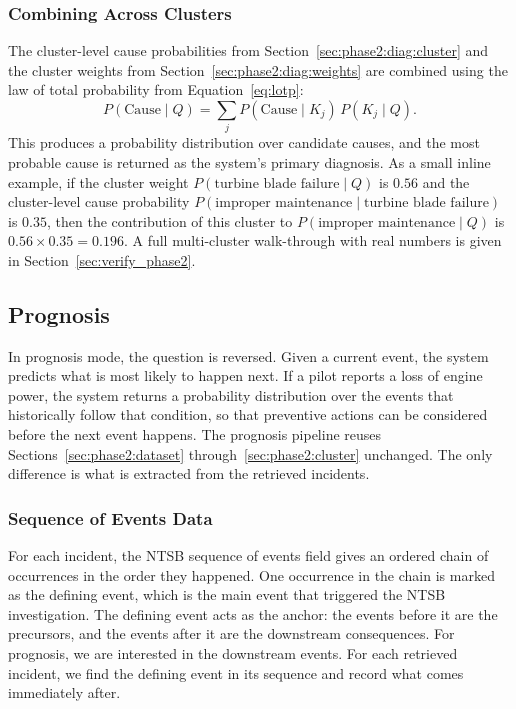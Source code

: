 \documentclass[11pt]{article}
\begin{document}
\subsubsection{Combining Across Clusters}
\label{sec:phase2:diag:lotp}

The cluster-level cause probabilities from Section~\ref{sec:phase2:diag:cluster} and the cluster weights from Section~\ref{sec:phase2:diag:weights} are combined using the law of total probability from Equation~\ref{eq:lotp}:
\begin{equation}
P(\text{Cause} \mid Q) = \sum_{j} P(\text{Cause} \mid K_j) \, P(K_j \mid Q).
\label{eq:diag_lotp}
\end{equation}
This produces a probability distribution over candidate causes, and the most probable cause is returned as the system's primary diagnosis. As a small inline example, if the cluster weight $P(\text{turbine blade failure} \mid Q)$ is $0.56$ and the cluster-level cause probability $P(\text{improper maintenance} \mid \text{turbine blade failure})$ is $0.35$, then the contribution of this cluster to $P(\text{improper maintenance} \mid Q)$ is $0.56 \times 0.35 = 0.196$. A full multi-cluster walk-through with real numbers is given in Section~\ref{sec:verify_phase2}.

\subsection{Prognosis}
\label{sec:phase2:prog}

In prognosis mode, the question is reversed. Given a current event, the system predicts what is most likely to happen next. If a pilot reports a loss of engine power, the system returns a probability distribution over the events that historically follow that condition, so that preventive actions can be considered before the next event happens. The prognosis pipeline reuses Sections~\ref{sec:phase2:dataset} through~\ref{sec:phase2:cluster} unchanged. The only difference is what is extracted from the retrieved incidents.

\subsubsection{Sequence of Events Data}
\label{sec:phase2:prog:seq}

For each incident, the NTSB sequence of events field gives an ordered chain of occurrences in the order they happened. One occurrence in the chain is marked as the defining event, which is the main event that triggered the NTSB investigation. The defining event acts as the anchor: the events before it are the precursors, and the events after it are the downstream consequences. For prognosis, we are interested in the downstream events. For each retrieved incident, we find the defining event in its sequence and record what comes immediately after.
\end{document}
